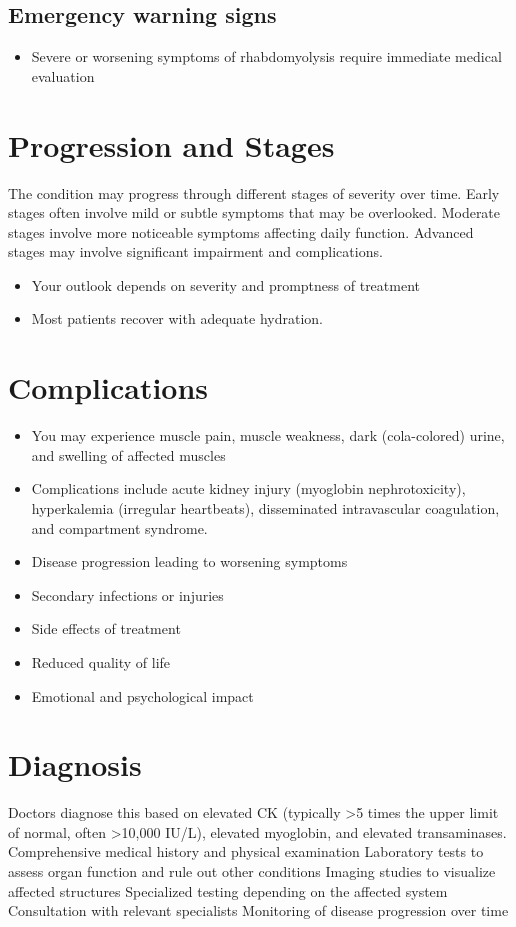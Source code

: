 \subsection{Emergency warning signs}
\begin{itemize}[noitemsep]
  \item Severe or worsening symptoms of rhabdomyolysis require immediate medical evaluation
\end{itemize}
\section{Progression and Stages}
The condition may progress through different stages of severity over time. Early stages often involve mild or subtle symptoms that may be overlooked. Moderate stages involve more noticeable symptoms affecting daily function. Advanced stages may involve significant impairment and complications.

\begin{itemize}[noitemsep]
  \item Your outlook depends on severity and promptness of treatment
  \item Most patients recover with adequate hydration.
\end{itemize}
\section{Complications}
\begin{itemize}[noitemsep]
  \item You may experience muscle pain, muscle weakness, dark (cola-colored) urine, and swelling of affected muscles
  \item Complications include acute kidney injury (myoglobin nephrotoxicity), hyperkalemia (irregular heartbeats), disseminated intravascular coagulation, and compartment syndrome.
  \item Disease progression leading to worsening symptoms
  \item Secondary infections or injuries
  \item Side effects of treatment
  \item Reduced quality of life
  \item Emotional and psychological impact
\end{itemize}
\section{Diagnosis}
Doctors diagnose this based on elevated CK (typically >5 times the upper limit of normal, often >10,000 IU/L), elevated myoglobin, and elevated transaminases. Comprehensive medical history and physical examination Laboratory tests to assess organ function and rule out other conditions Imaging studies to visualize affected structures Specialized testing depending on the affected system Consultation with relevant specialists Monitoring of disease progression over time

